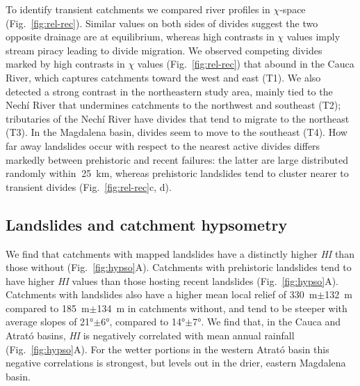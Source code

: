 \documentclass[draft]{agujournal2019}
\begin{document}
\par To identify transient catchments we compared river profiles in $\chi$-space (Fig.~\ref{fig:rel-rec}). Similar values on both sides of divides suggest the two opposite drainage are at equilibrium, whereas high contrasts in $\chi$ values imply stream piracy leading to divide migration. We observed competing divides marked by high contrasts in $\chi$ values (Fig.~\ref{fig:rel-rec}) that abound in the Cauca River, which captures catchments toward the west and east (T1). We also detected a strong contrast in the northeastern study area, mainly tied to the Nechí River that undermines catchments to the northwest and southeast (T2); tributaries of the Nechí River have divides that tend to migrate to the northeast (T3). In the Magdalena basin, divides seem to move to the southeast (T4). How far away landslides occur with respect to the nearest active divides differs markedly between prehistoric and recent failures: the latter are large distributed randomly within $~$25~km, whereas prehistoric landslides tend to cluster nearer to transient divides (Fig.~\ref{fig:rel-rec}c, d).

\subsection{Landslides and catchment hypsometry}

\par We find that catchments with mapped landslides have a distinctly higher \textit{HI} than those without (Fig.~\ref{fig:hypso}A). Catchments with prehistoric landslides tend to have higher \textit{HI} values than those hosting recent landslides (Fig.~\ref{fig:hypso}A). Catchments with landslides also have a higher mean local relief of 330~m$\pm$132~m compared to 185~m$\pm$134~m in catchments without, and tend to be steeper with average slopes of 21°$\pm$6°, compared to 14°$\pm$7°. We find that, in the Cauca and Atrató basins, \textit{HI} is negatively correlated with mean annual rainfall (Fig.~\ref{fig:hypso}A). For the wetter portions in the western Atrató basin this negative correlations is strongest, but levels out in the drier, eastern Magdalena basin. 
\end{document}
